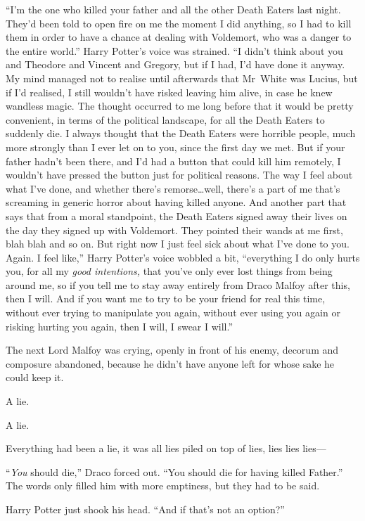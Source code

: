 “I’m the one who killed your father and all the other Death Eaters last night. They’d been told to open fire on me the moment I did anything, so I had to kill them in order to have a chance at dealing with Voldemort, who was a danger to the entire world.” Harry Potter’s voice was strained. “I didn’t think about you and Theodore and Vincent and Gregory, but if I had, I’d have done it anyway. My mind managed not to realise until afterwards that Mr~White was Lucius, but if I’d realised, I still wouldn’t have risked leaving him alive, in case he knew wandless magic. The thought occurred to me long before that it would be pretty convenient, in terms of the political landscape, for all the Death Eaters to suddenly die. I always thought that the Death Eaters were horrible people, much more strongly than I ever let on to you, since the first day we met. But if your father hadn’t been there, and I’d had a button that could kill him remotely, I wouldn’t have pressed the button just for political reasons. The way I feel about what I’ve done, and whether there’s remorse…well, there’s a part of me that’s screaming in generic horror about having killed anyone. And another part that says that from a moral standpoint, the Death Eaters signed away their lives on the day they signed up with Voldemort. They pointed their wands at me first, blah blah and so on. But right now I just feel sick about what I’ve done to you. Again. I feel like,” Harry Potter’s voice wobbled a bit, “everything I do only hurts you, for all my \emph{good intentions,} that you’ve only ever lost things from being around me, so if you tell me to stay away entirely from Draco Malfoy after this, then I will. And if you want me to try to be your friend for real this time, without ever trying to manipulate you again, without ever using you again or risking hurting you again, then I will, I swear I will.”

The next Lord Malfoy was crying, openly in front of his enemy, decorum and composure abandoned, because he didn’t have anyone left for whose sake he could keep it.

A lie.

A lie.

Everything had been a lie, it was all lies piled on top of lies, lies lies lies—

“\emph{You} should die,” Draco forced out. “You should die for having killed Father.” The words only filled him with more emptiness, but they had to be said.

Harry Potter just shook his head. “And if that’s not an option?”

